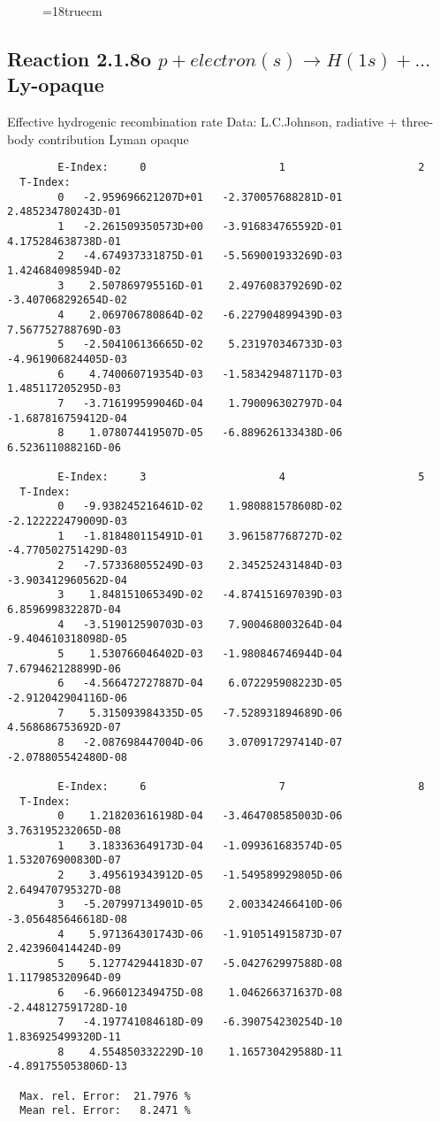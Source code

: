 \begin{figure} \label{2.1.8}
\epsfxsize=18truecm
\end{figure}
\newpage

\subsection{
  Reaction 2.1.8o $ p + electron(s) \rightarrow H(1s) + ...$ Ly-opaque
}

   Effective hydrogenic recombination rate
   Data: L.C.Johnson, radiative + three-body contribution
   Lyman opaque


\begin{verbatim}
        E-Index:     0                     1                     2
  T-Index:
        0   -2.959696621207D+01   -2.370057688281D-01    2.485234780243D-01
        1   -2.261509350573D+00   -3.916834765592D-01    4.175284638738D-01
        2   -4.674937331875D-01   -5.569001933269D-03    1.424684098594D-02
        3    2.507869795516D-01    2.497608379269D-02   -3.407068292654D-02
        4    2.069706780864D-02   -6.227904899439D-03    7.567752788769D-03
        5   -2.504106136665D-02    5.231970346733D-03   -4.961906824405D-03
        6    4.740060719354D-03   -1.583429487117D-03    1.485117205295D-03
        7   -3.716199599046D-04    1.790096302797D-04   -1.687816759412D-04
        8    1.078074419507D-05   -6.889626133438D-06    6.523611088216D-06

        E-Index:     3                     4                     5
  T-Index:
        0   -9.938245216461D-02    1.980881578608D-02   -2.122222479009D-03
        1   -1.818480115491D-01    3.961587768727D-02   -4.770502751429D-03
        2   -7.573368055249D-03    2.345252431484D-03   -3.903412960562D-04
        3    1.848151065349D-02   -4.874151697039D-03    6.859699832287D-04
        4   -3.519012590703D-03    7.900468003264D-04   -9.404610318098D-05
        5    1.530766046402D-03   -1.980846746944D-04    7.679462128899D-06
        6   -4.566472727887D-04    6.072295908223D-05   -2.912042904116D-06
        7    5.315093984335D-05   -7.528931894689D-06    4.568686753692D-07
        8   -2.087698447004D-06    3.070917297414D-07   -2.078805542480D-08

        E-Index:     6                     7                     8
  T-Index:
        0    1.218203616198D-04   -3.464708585003D-06    3.763195232065D-08
        1    3.183363649173D-04   -1.099361683574D-05    1.532076900830D-07
        2    3.495619343912D-05   -1.549589929805D-06    2.649470795327D-08
        3   -5.207997134901D-05    2.003342466410D-06   -3.056485646618D-08
        4    5.971364301743D-06   -1.910514915873D-07    2.423960414424D-09
        5    5.127742944183D-07   -5.042762997588D-08    1.117985320964D-09
        6   -6.966012349475D-08    1.046266371637D-08   -2.448127591728D-10
        7   -4.197741084618D-09   -6.390754230254D-10    1.836925499320D-11
        8    4.554850332229D-10    1.165730429588D-11   -4.891755053806D-13

  Max. rel. Error:  21.7976 %
  Mean rel. Error:   8.2471 %

\end{verbatim}
